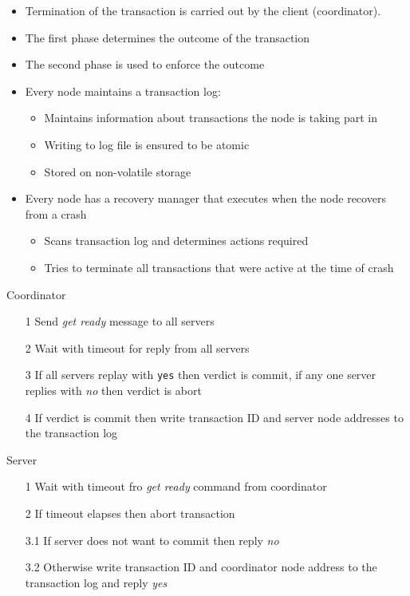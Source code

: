 \documentclass[a4paper]{article}
\begin{document}
\begin{itemize}
  \item Termination of the transaction is carried out by the client
        (coordinator).
  \item The first phase determines the outcome of the transaction
  \item The second phase is used to enforce the outcome
  \item Every node maintains a transaction log:
    \begin{itemize}
      \item Maintains information about transactions the node is taking part in
      \item Writing to log file is ensured to be atomic
      \item Stored on non-volatile storage
    \end{itemize}
  \item Every node has a recovery manager that executes when the node recovers
        from a crash
    \begin{itemize}
      \item Scans transaction log and determines actions required
      \item Tries to terminate all transactions that were active at the time of
            crash
    \end{itemize}
\end{itemize}


\begin{minipage}[t]{0.5\textwidth}
  Coordinator

  \begin{enumerate}
    \item[1] Send \textit{get ready} message to all servers
    \item[2] Wait with timeout for reply from all servers
    \item[3] If all servers replay with \texttt{yes} then verdict is commit, if
             any one server replies with \textit{no} then verdict is abort
    \item[4] If verdict is commit then write transaction ID and server node
             addresses to the transaction log
  \end{enumerate}
\end{minipage}%
\begin{minipage}[t]{0.5\textwidth}
  Server

  \begin{enumerate}
    \item[1]   Wait with timeout fro \textit{get ready} command from coordinator
    \item[2]   If timeout elapses then abort transaction
    \item[3.1] If server does not want to commit then reply \textit{no}
    \item[3.2] Otherwise write transaction ID and coordinator node address to
               the transaction log and reply \textit{yes}
  \end{enumerate}
\end{minipage}
\end{document}
